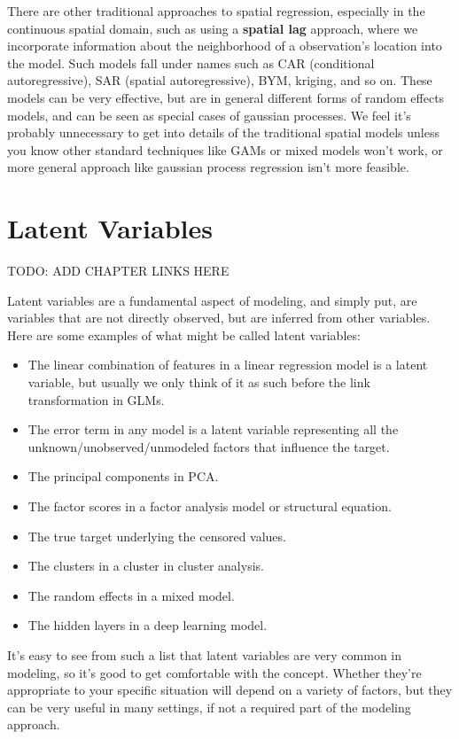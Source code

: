 \documentclass[
  letterpaper,
]{krantz}
\providecommand{\tightlist}{%
  \setlength{\itemsep}{0pt}\setlength{\parskip}{0pt}}\usepackage{longtable,booktabs,array}
\begin{document}
There are other traditional approaches to spatial regression, especially
in the continuous spatial domain, such as using a \textbf{spatial lag}
approach, where we incorporate information about the neighborhood of a
observation's location into the model. Such models fall under names such
as CAR (conditional autoregressive), SAR (spatial autoregressive), BYM,
kriging, and so on. These models can be very effective, but are in
general different forms of random effects models, and can be seen as
special cases of gaussian processes. We feel it's probably unnecessary
to get into details of the traditional spatial models unless you know
other standard techniques like GAMs or mixed models won't work, or more
general approach like gaussian process regression isn't more feasible.

\section{Latent Variables}\label{sec-data-latent}

TODO: ADD CHAPTER LINKS HERE

Latent variables are a fundamental aspect of modeling, and simply put,
are variables that are not directly observed, but are inferred from
other variables. Here are some examples of what might be called latent
variables:

\begin{itemize}
\tightlist
\item
  The linear combination of features in a linear regression model is a
  latent variable, but usually we only think of it as such before the
  link transformation in GLMs.
\item
  The error term in any model is a latent variable representing all the
  unknown/unobserved/unmodeled factors that influence the target.
\item
  The principal components in PCA.
\item
  The factor scores in a factor analysis model or structural equation.
\item
  The true target underlying the censored values.
\item
  The clusters in a cluster in cluster analysis.
\item
  The random effects in a mixed model.
\item
  The hidden layers in a deep learning model.
\end{itemize}

It's easy to see from such a list that latent variables are very common
in modeling, so it's good to get comfortable with the concept. Whether
they're appropriate to your specific situation will depend on a variety
of factors, but they can be very useful in many settings, if not a
required part of the modeling approach.
\end{document}
